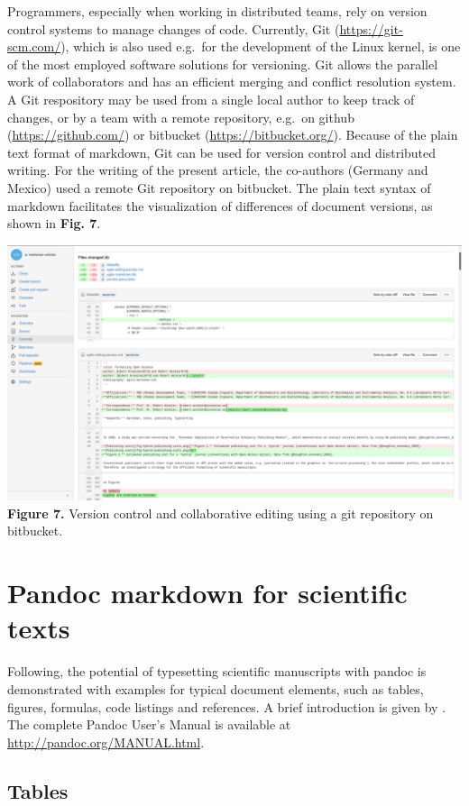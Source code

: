 \documentclass[10pt,fleqn]{wlpeerj}
\begin{document}
Programmers,
especially
when
working
in
distributed
teams,
rely
on
version
control
systems
to
manage
changes
of
code.
Currently,
Git
(\url{https://git-scm.com/}),
which
is
also
used
e.g.~for
the
development
of
the
Linux
kernel,
is
one
of
the
most
employed
software
solutions
for
versioning.
Git
allows
the
parallel
work
of
collaborators
and
has
an
efficient
merging
and
conflict
resolution
system.
A Git
respository
may
be
used
from
a
single
local
author
to
keep
track
of
changes,
or by
a
team
with
a
remote
repository,
e.g.~on
github
(\url{https://github.com/})
or
bitbucket
(\url{https://bitbucket.org/}).
Because
of
the
plain
text
format
of
markdown,
Git
can
be
used
for
version
control
and
distributed
writing.
For
the
writing
of
the
present
article,
the
co-authors
(Germany
and
Mexico)
used
a
remote
Git
repository
on
bitbucket.
The
plain
text
syntax
of
markdown
facilitates
the
visualization
of
differences
of
document
versions,
as
shown
in
\textbf{Fig.
7}.

\includegraphics{fig-bitbucket-diff.png}
\textbf{Figure
7.}
Version
control
and
collaborative
editing
using
a git
repository
on
bitbucket.

\section{Pandoc
markdown
for
scientific
texts}\label{pandoc-markdown-for-scientific-texts}

Following,
the
potential
of
typesetting
scientific
manuscripts
with
pandoc
is
demonstrated
with
examples
for
typical
document
elements,
such
as
tables,
figures,
formulas,
code
listings
and
references.
A
brief
introduction
is
given
by
\citep{dominici_pandoc_2014}.
The
complete
Pandoc
User's
Manual
is
available
at
\url{http://pandoc.org/MANUAL.html}.

\subsection{Tables}\label{tables}
\end{document}
